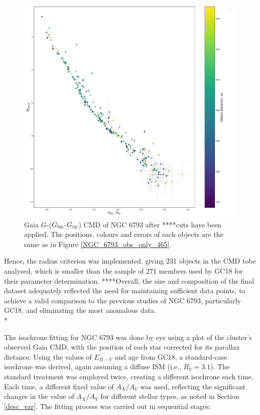 \documentclass[12pt, a4paper]{report}
\begin{document}
\begin{figure}[h!]
\begin{center}
\includegraphics[width=1.0\textwidth]{../NGC_6793_CMD_observational_errorbars_vizier.pdf}
\caption{Gaia $G$-($G_{\textnormal{bp}}$-$G_{\textnormal{rp}}$) CMD of NGC 6793 after ****cuts have been applied. The positions, colours and errors of each objects are the same as in Figure \ref{NGC_6793_obs_only_465}.}
\label{NGC_6793_obs_only}
\end{center}
\end{figure}

Hence, the radius criterion was implemented, giving 231 objects in the CMD tobe analysed, which is smaller than the sample of 271 members used by GC18 for their parameter determination. ****Overall, the size and composition of the final dataset adequately reflected the need for maintaining sufficient data points, to achieve a valid comparison to the previous studies of NGC 6793, particularly GC18, and eliminating the most anomalous data.\\*


The isochrone fitting for NGC 6793 was done by eye using a plot of the cluster's observed Gaia CMD, with the position of each star corrected for its parallax distance. Using the values of $E_{B-V}$ and age from GC18, a standard-case isochrone was derived, again assuming a diffuse ISM (i.e., $R_{V} = 3.1$). The standard treatment was employed twice, creating a different isochrone each time. Each time, a different fixed value of $A_{X}/A_{V}$ was used, reflecting the significant changes in the value of $A_{X}/A_{V}$ for different stellar types, as noted in Section \ref{desc_var}. The fitting process was carried out in sequential stages:
\end{document}
